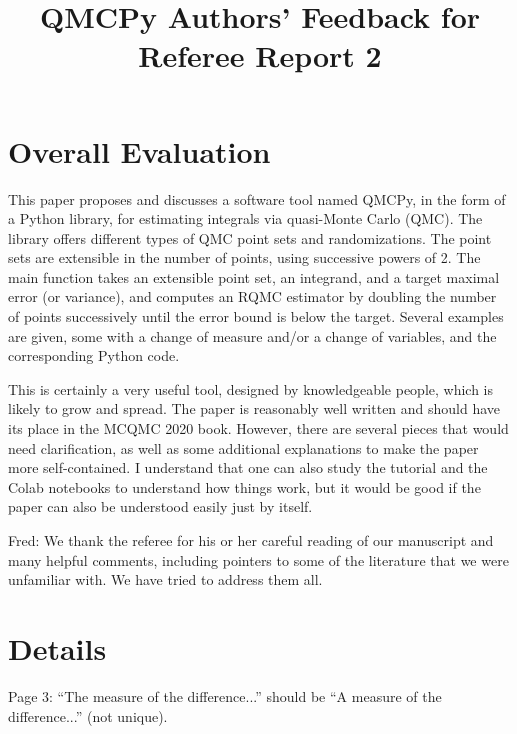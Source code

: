 \documentclass{amsart}
\begin{document}
\title{QMCPy Authors' Feedback for Referee Report 2}

\newcommand{\AGSComment}[1]{{\color{cyan} Aleksei: #1}}
\newcommand{\FJHComment}[1]{{\color{blue} Fred: #1}}

\maketitle


\section{Overall Evaluation}

This paper proposes and discusses a software tool named QMCPy, in the form of a Python library, for estimating integrals via quasi-Monte Carlo (QMC). The library offers different types of QMC point sets and randomizations. The point sets are extensible in the number of points, using successive powers of 2. The main function takes an extensible point set, an integrand, and a target maximal error (or variance), and computes an RQMC estimator by doubling the number of points successively until the error bound is below the target. Several examples are given, some with a change of measure and/or a change of variables, and the corresponding Python code.

This is certainly a very useful tool, designed by knowledgeable people, which is likely to grow and spread. The paper is reasonably well written and should have its place in the MCQMC 2020 book. However, there are several pieces that would need clarification, as well as some additional explanations to make the paper more self-contained. I understand that one can also study the tutorial and the Colab notebooks to understand how things work, but it would be good if the paper can also be understood easily just by itself.

\bigskip

\FJHComment{We thank the referee for his or her careful reading of our manuscript and many helpful comments, including pointers to some of the literature that we were unfamiliar with.  We have tried to address them all.}

\section{Details}

Page 3: ``The measure of the difference...'' should be ``A measure of the difference...'' (not
unique).
\end{document}
